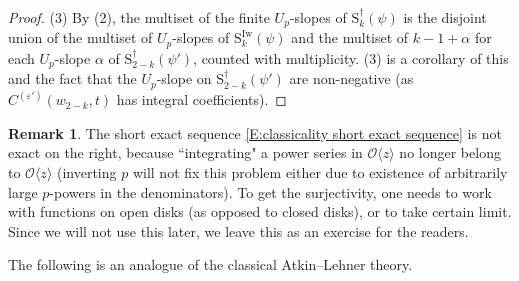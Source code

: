 \documentclass[12pt]{amsart}
\theoremstyle{definition}
\newtheorem{remark}[subsection]{Remark}
\numberwithin{equation}{subsection}
\def\calO{\mathcal{O}}
\def\rmS{\mathrm{S}}
\newcommand{\Iw}{\mathrm{Iw}}
\begin{document}
\begin{proof}
(3) By (2), the multiset of the finite $U_p$-slopes of $\rmS_{k}^{\dagger}(\psi)$ is the disjoint union of the multiset of $U_p$-slopes of $\rmS_{k}^{\Iw}(\psi)$ and the multiset of $k-1+\alpha$ for each $U_p$-slope $\alpha$ of $\rmS_{2-k}^{\dagger}(\psi')$, counted with multiplicity. (3) is a corollary of this and the fact that the $U_p$-slope on $\rmS_{2-k}^{\dagger}(\psi')$ are non-negative (as $C^{(\varepsilon')}(w_{2-k}, t)$ has integral coefficients).
\end{proof}


\begin{remark} The short exact sequence \eqref{E:classicality short exact sequence} is not exact on the right, because ``integrating" a power series in $\calO\langle z\rangle $ no longer belong to $\calO\langle z\rangle$ (inverting $p$ will not fix this problem either due to existence of arbitrarily large $p$-powers in the denominators). To get the surjectivity, one needs to work with functions on open disks (as opposed to closed disks), or to take certain limit. Since we will not use this later, we leave this as an exercise for the readers.

\end{remark}


The following is an analogue of the classical Atkin--Lehner theory. 
\end{document}
